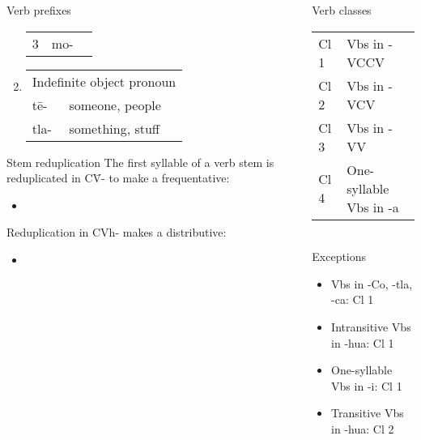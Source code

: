 \documentclass[12pt]{beamer}
\newcommand{\nah}[1]{\textcolor{nahgrn}{#1}}
\newcommand{\trs}[1]{\textcolor{nahblu}{#1}}
\begin{document}
\begin{frame}
\begin{columns}[t]
\begin{column}{0.18\linewidth}
\begin{block}{Verb prefixes}
\begin{enumerate}
\begin{tabular}[t]{llll}
                  3 & \multicolumn{2}{c}{\nah{mo-}}                                                                  \\
                \end{tabular}
          \item
                \begin{tabular}[t]{ll}
                  \multicolumn{2}{l}{Indefinite object pronoun} \\
                  \nah{tē-}  & \trs{someone, people}            \\
                  \nah{tla-} & \trs{something, stuff}           \\
                \end{tabular}
        \end{enumerate}
      \end{block}
      \begin{block}{Stem reduplication}
        The first syllable of a verb stem is reduplicated in \nah{C\=V-} to make a frequentative:
        \begin{itemize}
          \item 
        \end{itemize}
        Reduplication in \nah{CVh-} makes a distributive:
        \begin{itemize}
          \item 
        \end{itemize}
      \end{block}
    \end{column}
    \begin{column}{.18\linewidth}
      \begin{block}{Verb classes}
        \begin{tabular}{ll}
          Cl 1 & Vbs in \nah{-VCCV}           \\
          Cl 2 & Vbs in \nah{-VCV}            \\
          Cl 3 & Vbs in \nah{-VV}             \\
          Cl 4 & One-syllable Vbs in \nah{-a}
        \end{tabular}\\
        Exceptions
        \begin{itemize}
          \item Vbs in \nah{-Co}, \nah{-tla}, \nah{-ca}: Cl 1
          \item Intransitive Vbs in \nah{-hua}: Cl 1
          \item One-syllable Vbs in \nah{-i}: Cl 1
          \item Transitive Vbs in \nah{-hua}: Cl 2

\end{itemize}
\end{block}
\end{column}
\end{columns}
\end{frame}
\end{document}
